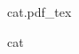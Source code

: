 \documentclass{article}
\newcommand{\incfig}[2][1]{%
      \def\svgwidth{#1\columnwidth}
      {#2.pdf_tex}
}
\begin{document}
\begin{figure}[ht]
    \centering
    \incfig{cat}
    \caption{cat}
    \label{fig:cat}
\end{figure}
\end{document}
